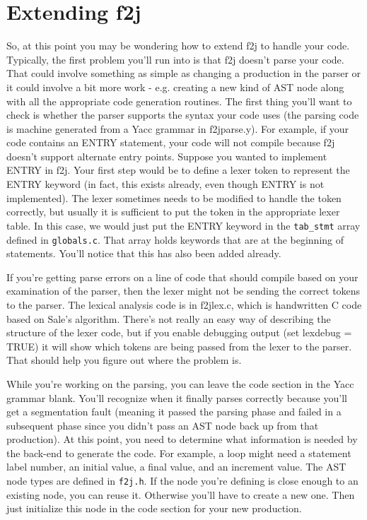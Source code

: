 \documentclass[11pt]{article}
\begin{document}
\section{Extending f2j}

So, at this point you may be wondering how to extend f2j to handle your code.
Typically, the first problem you'll run into is that f2j doesn't parse your
code. That could involve something as simple as changing a production in the
parser or it could involve a bit more work - e.g. creating a new kind of AST
node along with all the appropriate code generation routines. The first thing
you'll want to check is whether the parser supports the syntax your code uses
(the parsing code is machine generated from a Yacc grammar in f2jparse.y). For
example, if your code contains an ENTRY statement, your code will not compile
because f2j doesn't support alternate entry points.  Suppose you wanted to
implement ENTRY in f2j. Your first step would be to define a lexer token to
represent the ENTRY keyword (in fact, this exists already, even though ENTRY is
not implemented).  The lexer sometimes needs to be modified to handle the token
correctly, but usually it is sufficient to put the token in the appropriate
lexer table.  In this case, we would just put the ENTRY keyword in the
\verb|tab_stmt| array defined in \verb|globals.c|.  That array holds keywords
that are at the beginning of statements.  You'll notice that this has also been
added already.

If you're getting parse errors on a line of code that should compile based on
your examination of the parser, then the lexer might not be sending the correct
tokens to the parser. The lexical analysis code is in f2jlex.c, which is
handwritten C code based on Sale's algorithm. There's not really an easy way of
describing the structure of the lexer code, but if you enable debugging output
(set lexdebug = TRUE) it will show which tokens are being passed from the lexer
to the parser.  That should help you figure out where the problem is.

While you're working on the parsing, you can leave the code section in the Yacc
grammar blank.  You'll recognize when it finally parses correctly because
you'll get a segmentation fault (meaning it passed the parsing phase and
failed in a subsequent phase since you didn't pass an AST node back up from
that production).  At this point, you need to determine what information is
needed by the back-end to generate the code.  For example, a loop might need
a statement label number, an initial value, a final value, and an increment
value.  The AST node types are defined in \verb|f2j.h|.  If the node you're
defining is close enough to an existing node, you can reuse it.  Otherwise you'll
have to create a new one.  Then just initialize this node in the code
section for your new production.
\end{document}
